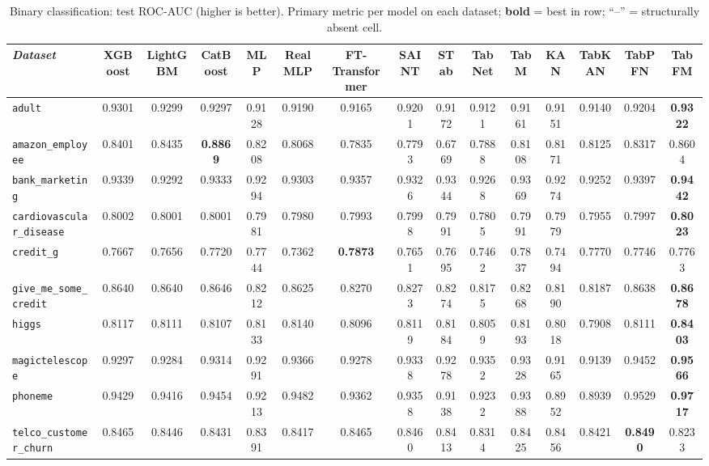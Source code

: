 \begin{landscape}

\begin{table}[htbp]
\centering
\footnotesize
\setlength{\tabcolsep}{2.5pt}
\caption[Binary classification: complete results]{Binary classification: test ROC-AUC (higher is better). Primary metric per model on each dataset; \textbf{bold} = best in row; ``--'' = structurally absent cell.}
\label{tab:app-binaria}
\begin{tabular}{lcccccccccccccc}
\toprule
\emph{Dataset} & XGBoost & LightGBM & CatBoost & MLP & RealMLP & FT-Transformer & SAINT & STab & TabNet & TabM & KAN & TabKAN & TabPFN & TabFM \\
\midrule
\texttt{adult} & 0.9301 & 0.9299 & 0.9297 & 0.9128 & 0.9190 & 0.9165 & 0.9201 & 0.9172 & 0.9121 & 0.9161 & 0.9151 & 0.9140 & 0.9204 & \textbf{0.9322} \\
\texttt{amazon\_\allowbreak employee} & 0.8401 & 0.8435 & \textbf{0.8869} & 0.8208 & 0.8068 & 0.7835 & 0.7793 & 0.6769 & 0.7888 & 0.8108 & 0.8171 & 0.8125 & 0.8317 & 0.8604 \\
\texttt{bank\_\allowbreak marketing} & 0.9339 & 0.9292 & 0.9333 & 0.9294 & 0.9303 & 0.9357 & 0.9326 & 0.9344 & 0.9268 & 0.9369 & 0.9274 & 0.9252 & 0.9397 & \textbf{0.9442} \\
\texttt{cardiovascular\_\allowbreak disease} & 0.8002 & 0.8001 & 0.8001 & 0.7981 & 0.7980 & 0.7993 & 0.7998 & 0.7991 & 0.7805 & 0.7991 & 0.7979 & 0.7955 & 0.7997 & \textbf{0.8023} \\
\texttt{credit\_g} & 0.7667 & 0.7656 & 0.7720 & 0.7744 & 0.7362 & \textbf{0.7873} & 0.7651 & 0.7695 & 0.7462 & 0.7837 & 0.7494 & 0.7770 & 0.7746 & 0.7763 \\
\texttt{give\_\allowbreak me\_\allowbreak some\_\allowbreak credit} & 0.8640 & 0.8640 & 0.8646 & 0.8212 & 0.8625 & 0.8270 & 0.8273 & 0.8274 & 0.8175 & 0.8268 & 0.8190 & 0.8187 & 0.8638 & \textbf{0.8678} \\
\texttt{higgs} & 0.8117 & 0.8111 & 0.8107 & 0.8133 & 0.8140 & 0.8096 & 0.8119 & 0.8184 & 0.8059 & 0.8193 & 0.8018 & 0.7908 & 0.8111 & \textbf{0.8403} \\
\texttt{magictelescope} & 0.9297 & 0.9284 & 0.9314 & 0.9291 & 0.9366 & 0.9278 & 0.9338 & 0.9278 & 0.9352 & 0.9328 & 0.9165 & 0.9139 & 0.9452 & \textbf{0.9566} \\
\texttt{phoneme} & 0.9429 & 0.9416 & 0.9454 & 0.9213 & 0.9482 & 0.9362 & 0.9358 & 0.9138 & 0.9232 & 0.9388 & 0.8952 & 0.8939 & 0.9529 & \textbf{0.9717} \\
\texttt{telco\_\allowbreak customer\_\allowbreak churn} & 0.8465 & 0.8446 & 0.8431 & 0.8391 & 0.8417 & 0.8465 & 0.8460 & 0.8413 & 0.8314 & 0.8425 & 0.8456 & 0.8421 & \textbf{0.8490} & 0.8233 \\
\bottomrule
\end{tabular}
\end{table}
\end{landscape}

